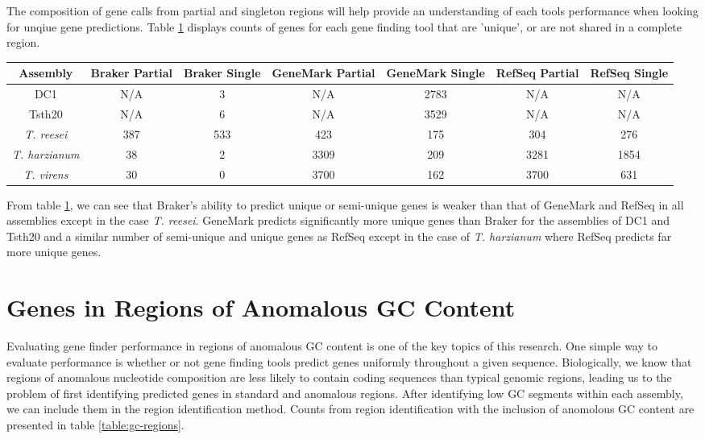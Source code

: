 The composition of gene calls from partial and singleton regions will
help provide an understanding of each tools performance when looking
for unqiue gene predictions. Table \ref{table:uniquegenes} displays
counts of genes for each gene finding tool that are 'unique', or are
not shared in a complete region.

\begin{table}
  \begin{center}
    \begin{tabular}{|c|c|c|c|c|c|c|}
      \hline
      Assembly & Braker Partial & Braker Single & GeneMark Partial & GeneMark Single & RefSeq Partial & RefSeq Single \\ \hline
      DC1 & N/A & 3 & N/A & 2783 & N/A & N/A \\ \hline
      Tsth20 & N/A & 6 & N/A & 3529 & N/A & N/A \\ \hline
      \textit{T. reesei} & 387 & 533 & 423 & 175 & 304 & 276 \\ \hline
      \textit{T. harzianum} & 38 & 2 & 3309 & 209 & 3281 & 1854 \\ \hline
      \textit{T. virens} & 30 & 0 & 3700 & 162 & 3700 & 631 \\ \hline
    \end{tabular}
  \end{center}
  \label{table:uniquegenes}
\end{table}

From table \ref{table:uniquegenes}, we can see that Braker's ability
to predict unique or semi-unique genes is weaker than that of GeneMark
and RefSeq in all assemblies except in the case
\textit{T. reesei}. GeneMark predicts significantly more unique genes
than Braker for the assemblies of DC1 and Tsth20 and a similar number
of semi-unique and unique genes as RefSeq except in the case of
\textit{T. harzianum} where RefSeq predicts far more unique genes.

\section{Genes in Regions of Anomalous GC Content}

Evaluating gene finder performance in regions of anomalous GC content
is one of the key topics of this research. One simple way to evaluate
performance is whether or not gene finding tools predict genes
uniformly throughout a given sequence. Biologically, we know that
regions of anomalous nucleotide composition are less likely to contain
coding sequences than typical genomic regions, leading us to the
problem of first identifying predicted genes in standard and anomalous
regions. After identifying low GC segments within each assembly, we
can include them in the region identification method. Counts from
region identification with the inclusion of anomolous GC content are
presented in table \ref{table:gc-regions}.

